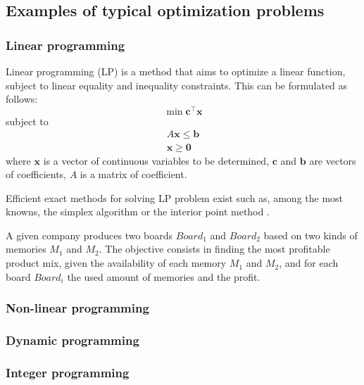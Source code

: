 \subsection{Examples of typical optimization problems}
\subsubsection{Linear programming}
Linear programming (LP) is a method that aims to optimize a linear function, subject to linear equality and inequality constraints. This can be formulated as follows:
\begin{equation}
\min \mathbf{c}^\intercal\mathbf{x}
\end{equation}
subject to
\begin{equation*}
\begin{gathered}
A\mathbf{x} \leq \mathbf{b}\\
\mathbf{x} \geq \mathbf{0}
\end{gathered}
\end{equation*}
where $\mathbf{x}$ is a vector of continuous variables to be determined, $\mathbf{c}$ and $\mathbf{b}$ are vectors of coefficients, $A$ is a matrix of coefficient.

Efficient exact methods for solving LP problem exist such as, among the most knowns, the simplex algorithm \cite{dantzig51} or the interior point method \cite{Karmarkar84}.

\begin{example}
A given company produces two boards $Board_1$ and $Board_2$ based on two kinds of memories $M_1$ and $M_2$. The objective consists in finding the most profitable product mix, given the availability of each memory $M_1$ and $M_2$, and for each board $Board_i$ the used amount of memories and the profit. 
\end{example}


\subsubsection{Non-linear programming}


\subsubsection{Dynamic programming}


\subsubsection{Integer programming}


